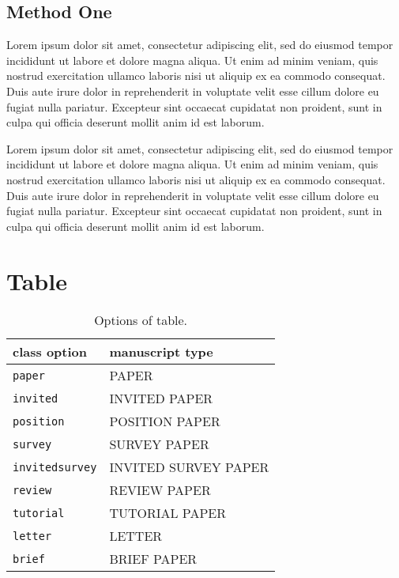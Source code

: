 \documentclass{MasterThesis}
\begin{document}
\subsection{Method One}

Lorem ipsum dolor sit amet, consectetur adipiscing elit, sed do eiusmod tempor incididunt ut labore et dolore magna aliqua. 
Ut enim ad minim veniam, quis nostrud exercitation ullamco laboris nisi ut aliquip ex ea commodo consequat. 
Duis aute irure dolor in reprehenderit in voluptate velit esse cillum dolore eu fugiat nulla pariatur. 
Excepteur sint occaecat cupidatat non proident, sunt in culpa qui officia deserunt mollit anim id est laborum.

Lorem ipsum dolor sit amet, consectetur adipiscing elit, sed do eiusmod tempor incididunt ut labore et dolore magna aliqua. 
Ut enim ad minim veniam, quis nostrud exercitation ullamco laboris nisi ut aliquip ex ea commodo consequat. 
Duis aute irure dolor in reprehenderit in voluptate velit esse cillum dolore eu fugiat nulla pariatur. 
Excepteur sint occaecat cupidatat non proident, sunt in culpa qui officia deserunt mollit anim id est laborum.

\newpage
\section{Table}

\begin{table}[h]
\caption{Options of table.}
\begin{center}
\begin{tabular}{ll}
\hline
\textbf{class option}  & \textbf{manuscript type}\\
\hline
\texttt{paper}         & \textsf{PAPER}\\
\texttt{invited}       & \textsf{INVITED PAPER}\\
\texttt{position}      & \textsf{POSITION PAPER}\\
\texttt{survey}        & \textsf{SURVEY PAPER}\\
\texttt{invitedsurvey} & \textsf{INVITED SURVEY PAPER}\\
\texttt{review}        & \textsf{REVIEW PAPER}\\
\texttt{tutorial}      & \textsf{TUTORIAL PAPER}\\
\hline
\texttt{letter}        & \textsf{LETTER}\\
\texttt{brief}         & \textsf{BRIEF PAPER}\\
\hline
\end{tabular}%
\end{center}
\end{table}
\end{document}

